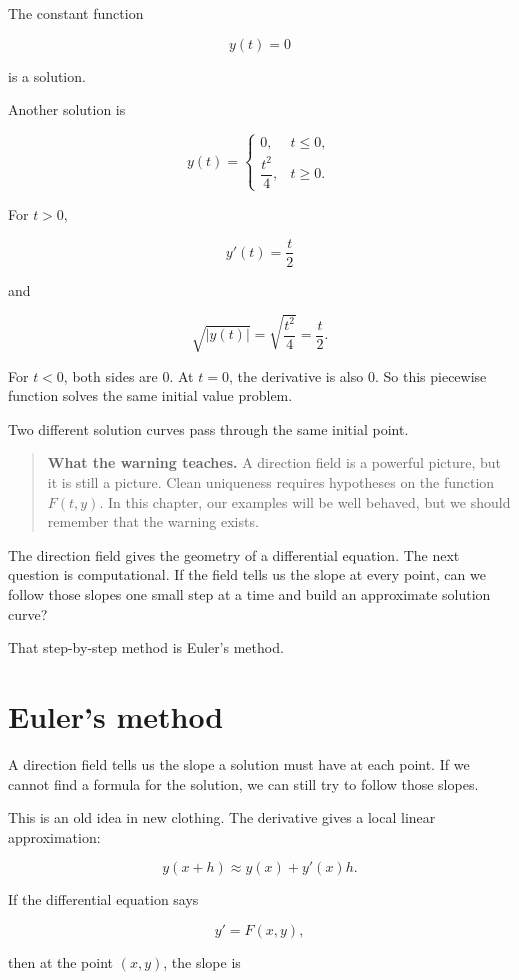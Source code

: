 The constant function

\[
y(t)=0
\]

is a solution.

Another solution is

\[
y(t)=
\begin{cases}
0, & t\le 0,\\[3pt]
\dfrac{t^2}{4}, & t\ge 0.
\end{cases}
\]

For \(t>0\),

\[
y'(t)=\frac{t}{2}
\]

and

\[
\sqrt{|y(t)|}
=
\sqrt{\frac{t^2}{4}}
=
\frac{t}{2}.
\]

For \(t<0\), both sides are \(0\).  At \(t=0\), the derivative is also \(0\).  So this
piecewise function solves the same initial value problem.

Two different solution curves pass through the same initial point.

\begin{quote}
\textbf{What the warning teaches.}
A direction field is a powerful picture, but it is still a picture.  Clean uniqueness
requires hypotheses on the function \(F(t,y)\).  In this chapter, our examples will be
well behaved, but we should remember that the warning exists.
\end{quote}

The direction field gives the geometry of a differential equation.  The next question is
computational.  If the field tells us the slope at every point, can we follow those slopes
one small step at a time and build an approximate solution curve?

That step-by-step method is Euler's method.
\section{Euler's method}
\label{sec:eulers-method}

A direction field tells us the slope a solution must have at each point.  If we cannot
find a formula for the solution, we can still try to follow those slopes.

This is an old idea in new clothing.  The derivative gives a local linear approximation:

\[
y(x+h)\approx y(x)+y'(x)h.
\]

If the differential equation says

\[
y'=F(x,y),
\]

then at the point \((x,y)\), the slope is

